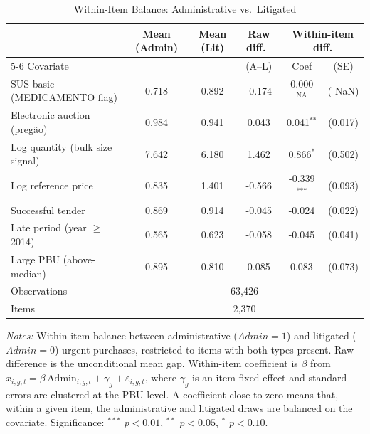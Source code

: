 \begin{table}[ht]
  \centering
  \caption{Within-Item Balance: Administrative vs.\ Litigated}
  \label{tab:balance_within}
  \small
  \begin{threeparttable}
  \begin{tabular}{lccccc}
    \toprule
    & Mean (Admin) & Mean (Lit) & Raw diff.\ & \multicolumn{2}{c}{Within-item diff.}\\
    \cmidrule(lr){5-6}
    Covariate &  &  & (A--L) & Coef & (SE) \\
    \midrule
    SUS basic (MEDICAMENTO flag) & 0.718 & 0.892 & -0.174 & 0.000$^{\text{NA}}$ & ( NaN) \\
    Electronic auction (preg\~{a}o) & 0.984 & 0.941 & 0.043 & 0.041$^{\text{**}}$ & (0.017) \\
    Log quantity (bulk size signal) & 7.642 & 6.180 & 1.462 & 0.866$^{\text{*}}$ & (0.502) \\
    Log reference price & 0.835 & 1.401 & -0.566 & -0.339$^{\text{***}}$ & (0.093) \\
    Successful tender & 0.869 & 0.914 & -0.045 & -0.024$^{\text{}}$ & (0.022) \\
    Late period (year $\geq$ 2014) & 0.565 & 0.623 & -0.058 & -0.045$^{\text{}}$ & (0.041) \\
    Large PBU (above-median) & 0.895 & 0.810 & 0.085 & 0.083$^{\text{}}$ & (0.073) \\
    \midrule
    Observations & \multicolumn{5}{c}{63{,}426}\\
    Items        & \multicolumn{5}{c}{2{,}370}\\
    \bottomrule
  \end{tabular}
  \begin{tablenotes}
    \small
    \item \textit{Notes:} Within-item balance between administrative
    ($Admin = 1$) and litigated ($Admin = 0$) urgent purchases, restricted
    to items with both types present. Raw difference is the unconditional
    mean gap. Within-item coefficient is $\beta$ from
    $x_{i,g,t} = \beta\,\text{Admin}_{i,g,t} + \gamma_g + \varepsilon_{i,g,t}$,
    where $\gamma_g$ is an item fixed effect and standard errors are
    clustered at the PBU level. A coefficient close to zero means that,
    within a given item, the administrative and litigated draws are
    balanced on the covariate. Significance: $^{***}$ $p<0.01$,
    $^{**}$ $p<0.05$, $^{*}$ $p<0.10$.
  \end{tablenotes}
  \end{threeparttable}
\end{table}

